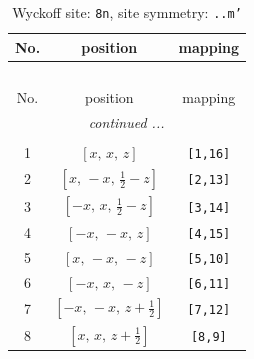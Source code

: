 \documentclass[fleqn,8pt]{jsarticle}
\begin{document}
\begin{longtable}{ccc}
\caption{Wyckoff site: {\tt 8n}, site symmetry: {\tt ..m'}}
 \\
 \hline \hline
No. & position & mapping \\ \hline \endfirsthead

\multicolumn{2}{l}{\tablename\ \thetable{}} \\
 \hline \hline
No. & position & mapping \\ \hline \endhead

 \hline \hline
\multicolumn{2}{r}{\footnotesize\it continued ...} \\ \endfoot

 \hline \hline
\multicolumn{2}{r}{} \\ \endlastfoot

1 & $\left[ x,\, x,\, z \right]$ & {\tt [1,16]} \\ \hline
2 & $\left[ x,\, - x,\, \frac{1}{2} - z \right]$ & {\tt [2,13]} \\ \hline
3 & $\left[ - x,\, x,\, \frac{1}{2} - z \right]$ & {\tt [3,14]} \\ \hline
4 & $\left[ - x,\, - x,\, z \right]$ & {\tt [4,15]} \\ \hline
5 & $\left[ x,\, - x,\, - z \right]$ & {\tt [5,10]} \\ \hline
6 & $\left[ - x,\, x,\, - z \right]$ & {\tt [6,11]} \\ \hline
7 & $\left[ - x,\, - x,\, z + \frac{1}{2} \right]$ & {\tt [7,12]} \\ \hline
8 & $\left[ x,\, x,\, z + \frac{1}{2} \right]$ & {\tt [8,9]} \\
\end{longtable}
\renewcommand{\arraystretch}{1.2}
\end{document}
